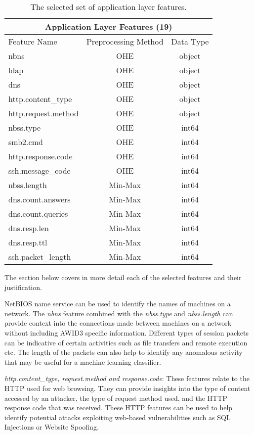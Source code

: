 \begin{table}[H]
\centering
\begin{tabular}{lcc}
\hline
\multicolumn{3}{c}{\textbf{Application Layer Features (19)}} \\ \hline
Feature Name & Preprocessing Method & Data Type \\ \hline
nbns & OHE & object \\
ldap & OHE & object \\
dns & OHE & object \\
http.content\_type & OHE & object \\
http.request.method & OHE & object \\
nbss.type & OHE & int64 \\
smb2.cmd & OHE & int64 \\
http.response.code & OHE & int64 \\
ssh.message\_code & OHE & int64 \\
nbss.length & Min-Max & int64 \\
dns.count.answers & Min-Max & int64 \\
dns.count.queries & Min-Max & int64 \\
dns.resp.len & Min-Max & int64 \\
dns.resp.ttl & Min-Max & int64 \\
ssh.packet\_length & Min-Max & int64 \\ \hline
\end{tabular}
\caption{The selected set of application layer features.}
\label{tab:application_features}
\end{table}

The section below covers in more detail each of the selected features and their justification.

NetBIOS name service can be used to identify the names of machines on a network. The \textit{nbns} feature combined with the \textit{nbss.type} and \textit{nbss.length} can provide context into the connections made between machines on a network without including AWID3 specific information. Different types of session packets can be indicative of certain activities such as file transfers and remote execution etc. The length of the packets can also help to identify any anomalous activity that may be useful for a machine learning classifier. 

\medskip
\textit{http.content\_type, request.method and response.code}: These features relate to the HTTP used for web browsing. They can provide insights into the type of content accessed by an attacker, the type of request method used, and the HTTP response code that was received. These HTTP features can be used to help identify potential attacks exploiting web-based vulnerabilities such as SQL Injections or Website Spoofing.

